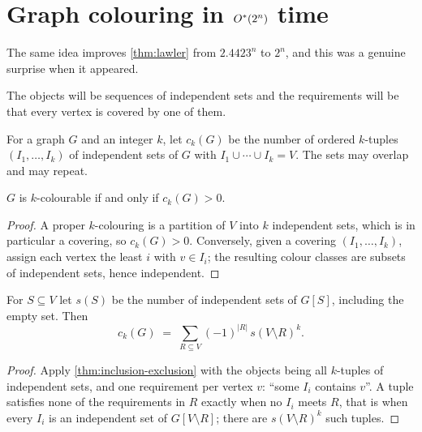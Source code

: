\section{Graph colouring in \texorpdfstring{$O^{*}(2^n)$}{O*(2n)} time}
\label{sec:ie-colouring}

The same idea improves \cref{thm:lawler} from $2.4423^n$ to $2^n$, and this was
a genuine surprise when it appeared.

The objects will be sequences of independent sets and the requirements will be
that every vertex is covered by one of them.

\begin{definition}\label{def:ck}
For a graph $G$ and an integer $k$, let $c_k(G)$ be the number of ordered
$k$-tuples $(I_1, \ldots, I_k)$ of independent sets of $G$ with
$I_1 \cup \cdots \cup I_k = V$. The sets may overlap and may repeat.
\end{definition}

\begin{lemma}\label{lem:ck-colourable}
$G$ is $k$-colourable if and only if $c_k(G) > 0$.
\end{lemma}

\begin{proof}
A proper $k$-colouring is a partition of $V$ into $k$ independent sets, which is
in particular a covering, so $c_k(G) > 0$. Conversely, given a covering
$(I_1,\ldots,I_k)$, assign each vertex the least $i$ with $v \in I_i$; the
resulting colour classes are subsets of independent sets, hence independent.
\end{proof}

\begin{lemma}\label{lem:ck-formula}
For $S \subseteq V$ let $s(S)$ be the number of independent sets of $G[S]$,
including the empty set. Then
\[ c_k(G) \;=\; \sum_{R \subseteq V} (-1)^{|R|} \, s(V \setminus R)^k . \]
\end{lemma}

\begin{proof}
Apply \cref{thm:inclusion-exclusion} with the objects being all $k$-tuples of
independent sets, and one requirement per vertex $v$: ``some $I_i$ contains
$v$''. A tuple satisfies none of the requirements in $R$ exactly when no $I_i$
meets $R$, that is when every $I_i$ is an independent set of
$G[V \setminus R]$; there are $s(V\setminus R)^k$ such tuples.
\end{proof}

